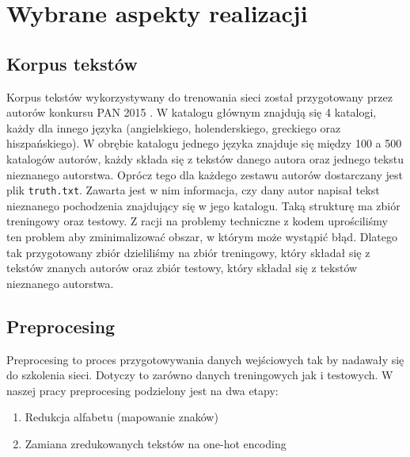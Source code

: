 \newpage
\section{Wybrane aspekty realizacji}

\subsection{Korpus tekstów}
Korpus tekstów wykorzystywany do trenowania sieci został przygotowany przez autorów konkursu PAN 2015 \cite{pan}.
W katalogu głównym znajdują się 4 katalogi, każdy dla innego języka (angielskiego, holenderskiego, greckiego oraz hiszpańskiego).
W obrębie katalogu jednego języka znajduje się między 100 a 500 katalogów autorów, każdy składa się z tekstów danego autora oraz jednego
tekstu nieznanego autorstwa. Oprócz tego dla każdego zestawu autorów dostarczany jest plik \texttt{truth.txt}.
Zawarta jest w nim informacja, czy dany autor napisał tekst nieznanego pochodzenia znajdujący się w jego katalogu.
Taką strukturę ma zbiór treningowy oraz testowy. Z racji na problemy techniczne z kodem uprościliśmy ten problem 
aby zminimalizować obszar, w którym może wystąpić błąd. Dlatego tak przygotowany zbiór dzieliliśmy na zbiór treningowy, który
składał się z tekstów znanych autorów oraz zbiór testowy, który składał się z tekstów nieznanego autorstwa. 

\myspace
{}
\myspace

\subsection{Preprocesing}
Preprocesing to proces przygotowywania danych wejściowych tak by nadawały się do szkolenia sieci.
Dotyczy to zarówno danych treningowych jak i testowych.
W naszej pracy preprocesing podzielony jest na dwa etapy:
\begin{enumerate}
	\item Redukcja alfabetu (mapowanie znaków)
	\item Zamiana zredukowanych tekstów na one-hot encoding
\end{enumerate}

